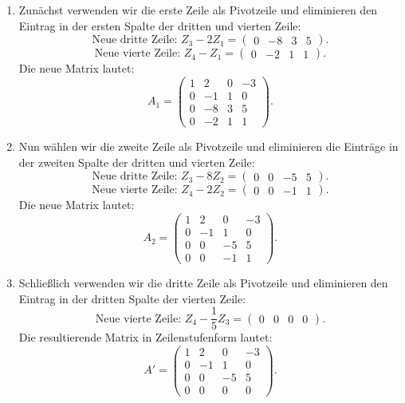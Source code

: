 \documentclass[11pt]{article}
\begin{document}
\begin{enumerate}
    \item Zunächst verwenden wir die erste Zeile als Pivotzeile und eliminieren den Eintrag in der ersten Spalte der dritten und vierten Zeile:
    \[
    \text{Neue dritte Zeile: } Z_3 - 2Z_1 = \begin{pmatrix} 0 & -8 & 3 & 5 \end{pmatrix}.
    \]
    \[
    \text{Neue vierte Zeile: } Z_4 - Z_1 = \begin{pmatrix} 0 & -2 & 1 & 1 \end{pmatrix}.
    \]
    Die neue Matrix lautet:
    \[
    A_1 = \begin{pmatrix}
    1 & 2 & 0 & -3 \\
    0 & -1 & 1 & 0 \\
    0 & -8 & 3 & 5 \\
    0 & -2 & 1 & 1
    \end{pmatrix}.
    \]

    \item Nun wählen wir die zweite Zeile als Pivotzeile und eliminieren die Einträge in der zweiten Spalte der dritten und vierten Zeile:
    \[
    \text{Neue dritte Zeile: } Z_3 - 8Z_2 = \begin{pmatrix} 0 & 0 & -5 & 5 \end{pmatrix}.
    \]
    \[
    \text{Neue vierte Zeile: } Z_4 - 2Z_2 = \begin{pmatrix} 0 & 0 & -1 & 1 \end{pmatrix}.
    \]
    Die neue Matrix lautet:
    \[
    A_2 = \begin{pmatrix}
    1 & 2 & 0 & -3 \\
    0 & -1 & 1 & 0 \\
    0 & 0 & -5 & 5 \\
    0 & 0 & -1 & 1
    \end{pmatrix}.
    \]

    \item Schließlich verwenden wir die dritte Zeile als Pivotzeile und eliminieren den Eintrag in der dritten Spalte der vierten Zeile:
    \[
    \text{Neue vierte Zeile: } Z_4 - \frac{1}{5} Z_3 = \begin{pmatrix} 0 & 0 & 0 & 0 \end{pmatrix}.
    \]
    Die resultierende Matrix in Zeilenstufenform lautet:
    \[
    A' = \begin{pmatrix}
    1 & 2 & 0 & -3 \\
    0 & -1 & 1 & 0 \\
    0 & 0 & -5 & 5 \\
    0 & 0 & 0 & 0
    \end{pmatrix}.
    \]
\end{enumerate}
\end{document}
